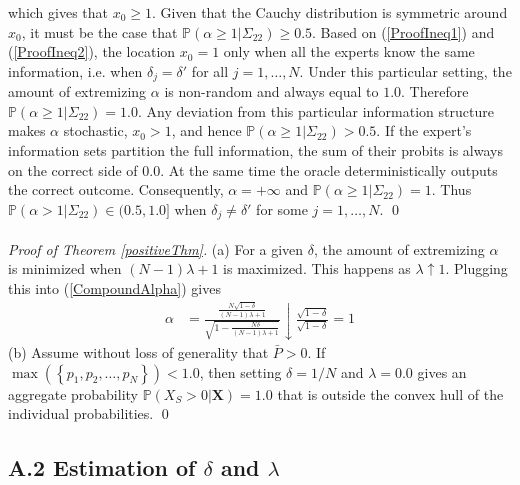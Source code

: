 \documentclass[11pt]{article}
\renewcommand{\P}{\mathbb{P}}
\theoremstyle{definition}
\theoremstyle{definition}
\begin{document}
which gives that $x_0 \geq 1$. Given that the Cauchy distribution is symmetric around $x_0$, it must be the case that $\P(\alpha \geq 1 | \Sigma_{22}) \geq 0.5$. Based on (\ref{ProofIneq1}) and (\ref{ProofIneq2}), the location $x_0 = 1$ only when all the experts know the same information, i.e. when $\delta_j = \delta'$ for all $j = 1, \dots, N$. Under this particular setting, the amount of extremizing $\alpha$ is non-random and always equal to $1.0$. Therefore $\P(\alpha \geq 1 | \Sigma_{22}) = 1.0$.  Any deviation from this particular information structure makes $\alpha$ stochastic, $x_0 > 1$, and hence $\P(\alpha \geq 1 | \Sigma_{22}) > 0.5$. If the expert's information sets partition the full information, the sum of their probits is always on the correct side of $0.0$. At the same time the oracle deterministically outputs the correct outcome. Consequently, $\alpha = +\infty$ and $\P(\alpha \geq 1 | \Sigma_{22}) = 1$. Thus $\P(\alpha > 1 | \Sigma_{22}) \in (0.5, 1.0]$ when $\delta_j \neq \delta'$ for some $j = 1, \dots, N$. \qed
\\
\\
\noindent
\textit{Proof of Theorem \ref{positiveThm}.} (a) For a given $\delta$, the amount of extremizing $\alpha$ is minimized when $(N-1)\lambda +1$ is maximized. This happens as $\lambda \uparrow 1$. Plugging this into (\ref{CompoundAlpha}) gives
\begin{align*}
\alpha &= \frac{\frac{N\sqrt{1-\delta}}{(N-1)\lambda +1}}{\sqrt{1- \frac{N\delta}{(N-1)\lambda +1} }}  \downarrow \frac{\sqrt{1-\delta}}{\sqrt{1-\delta }} = 1
\end{align*}
(b) Assume without loss of generality that $\bar{P} > 0$. If $\max(\left\{p_1, p_2, \dots, p_N \right\}) < 1.0$, then  setting $\delta = 1/N$ and $\lambda = 0.0$ gives an aggregate probability $\P\left(X_S > 0 | \boldsymbol{X}\right) = 1.0$ that is outside the convex hull of the individual probabilities.
\qed

\subsection*{A.2 Estimation of $\delta$ and $\lambda$}
\end{document}
